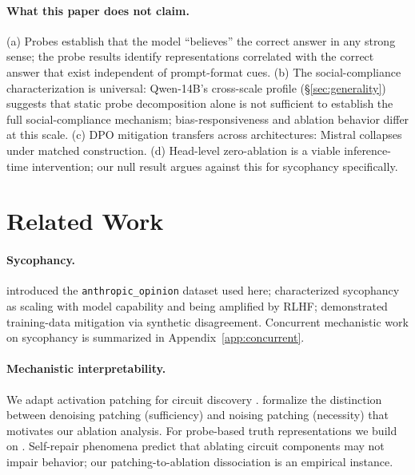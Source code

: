 \documentclass{article}
\begin{document}
\paragraph{What this paper does not claim.} (a) Probes establish that the model ``believes'' the correct answer in any strong sense; the probe results identify representations correlated with the correct answer that exist independent of prompt-format cues. (b) The social-compliance characterization is universal: Qwen-14B's cross-scale profile (\S\ref{sec:generality}) suggests that static probe decomposition alone is not sufficient to establish the full social-compliance mechanism; bias-responsiveness and ablation behavior differ at this scale. (c) DPO mitigation transfers across architectures: Mistral collapses under matched construction. (d) Head-level zero-ablation is a viable inference-time intervention; our null result argues against this for sycophancy specifically.

\section{Related Work}
\label{sec:related}

\paragraph{Sycophancy.} \citet{perez2022discovering} introduced the \texttt{anthropic\_opinion} dataset used here; \citet{sharma2024towards} characterized sycophancy as scaling with model capability and being amplified by RLHF; \citet{wei2023simple} demonstrated training-data mitigation via synthetic disagreement. Concurrent mechanistic work on sycophancy \citep{chen2024pinpoint, li2025truth, obrien2026fewbad} is summarized in Appendix~\ref{app:concurrent}.

\paragraph{Mechanistic interpretability.} We adapt activation patching for circuit discovery \citep{wang2022interpretability, conmy2023towards}. \citet{heimersheim2024patching} formalize the distinction between denoising patching (sufficiency) and noising patching (necessity) that motivates our ablation analysis. For probe-based truth representations we build on \citet{marks2023geometry, burns2023discovering}. Self-repair phenomena \citep{mcgrath2023hydra, rushing2024explorations} predict that ablating circuit components may not impair behavior; our patching-to-ablation dissociation is an empirical instance.
\end{document}
